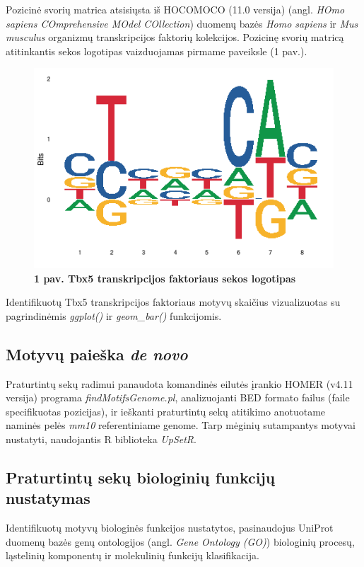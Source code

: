 \documentclass[12pt]{article}
\begin{document}
Pozicinė svorių matrica atsisiųsta iš HOCOMOCO\cite{HOCOMOCO} (11.0 versija)
(angl. \emph{HOmo sapiens COmprehensive MOdel COllection}) duomenų bazės
\emph{Homo sapiens} ir \emph{Mus musculus} organizmų transkripcijos faktorių
kolekcijos. Pozicinę svorių matricą atitinkantis sekos logotipas vaizduojamas
pirmame paveiksle (1 pav.).

\begin{figure}[htb]
    \begin{center}
        \includegraphics[width=0.5\linewidth]{../Figures/tbx5_motif.png}
        \vspace{-2\baselineskip}
        \caption*{\small\textbf{1 pav. Tbx5 transkripcijos faktoriaus
                                sekos logotipas}}
    \end{center}
\end{figure}

Identifikuotų Tbx5 transkripcijos faktoriaus motyvų skaičius vizualizuotas su
pagrindinėmis \emph{ggplot()} ir \emph{geom\_bar()} funkcijomis.

\subsection{Motyvų paieška \emph{de novo}}
Praturtintų sekų radimui panaudota komandinės eilutės įrankio HOMER\cite{HOMER}
(v4.11 versija) programa \emph{findMotifsGenome.pl}, analizuojanti BED formato
failus (faile specifikuotas pozicijas), ir ieškanti praturtintų sekų atitikimo
anotuotame naminės pelės \emph{mm10} referentiniame genome. Tarp mėginių
sutampantys motyvai nustatyti, naudojantis R biblioteka
\emph{UpSetR}\cite{UPSETR}.

\subsection{Praturtintų sekų biologinių funkcijų nustatymas}
Identifikuotų motyvų biologinės funkcijos nustatytos, pasinaudojus
UniProt\cite{UNIPROT} duomenų bazės genų ontologijos (angl. \emph{Gene
Ontology (GO)}) biologinių procesų, ląstelinių komponentų ir molekulinių
funkcijų klasifikacija.
\end{document}
